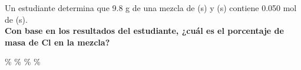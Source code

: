 Un estudiante determina que 9.8 g de una mezcla de (s) y (s) contiene 0.050 mol de (s).\\
\textbf{Con base en los resultados del estudiante, ¿cuál es el porcentaje de masa de Cl en la mezcla?}\\

\begin{choices}
    \%
    \%
    \%
    \%
\end{choices}